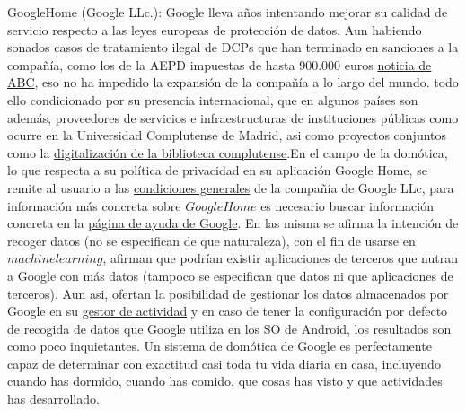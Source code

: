 GoogleHome (Google LLc.): Google lleva años intentando mejorar su calidad de servicio respecto a las leyes europeas de protección de datos. Aun habiendo sonados casos de tratamiento ilegal de DCPs que han terminado en sanciones a la compañía, como los de la AEPD impuestas de hasta 900.000 euros \href{https://www.abc.es/tecnologia/redes/20131219/abci-google-multa-aepd-201312191217.html}{noticia de ABC}, eso no ha impedido la expansión de la compañía a lo largo del mundo. todo ello condicionado por su presencia internacional, que en algunos países son además, proveedores de servicios e infraestructuras de instituciones públicas como ocurre en la Universidad Complutense de Madrid, asi como proyectos conjuntos como la \href{https://biblioteca.ucm.es/google8}{digitalización de la biblioteca complutense}.En el campo de la domótica, lo que respecta a su política de privacidad en su aplicación Google Home, se remite al usuario a las \href{https://policies.google.com/privacy?hl=es}{condiciones generales} de la compañía de Google LLc, para información más concreta sobre $Google Home$ es necesario buscar información concreta en la \href{https://support.google.com/googlehome/answer/7072285?hl=es&ref_topic=7173611}{página de ayuda de Google}. En las misma se afirma la intención de recoger datos (no se especifican de que naturaleza), con el fin de usarse en $machine learning$, afirman que podrían existir aplicaciones de terceros que nutran a Google con más datos (tampoco se especifican que datos ni que aplicaciones de terceros). Aun asi, ofertan la posibilidad de gestionar los datos almacenados por Google en su \href{https://myactivity.google.com/}{gestor de actividad} y en caso de tener la configuración por defecto de recogida de datos que Google utiliza en los SO de Android, los resultados son como poco inquietantes. Un sistema de domótica de Google es perfectamente capaz de determinar con exactitud casi toda tu vida diaria en casa, incluyendo cuando has dormido, cuando has comido, que cosas has visto y que actividades has desarrollado.

